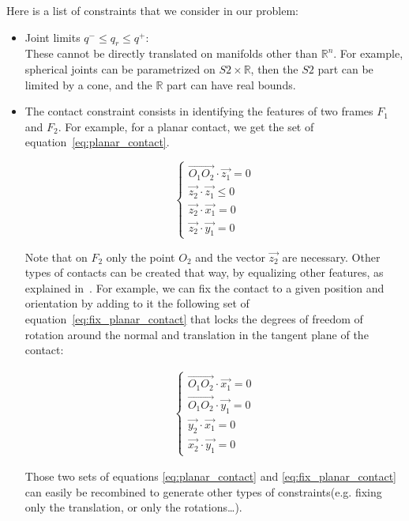 Here is a list of constraints that we consider in our problem:
\begin{itemize}
\item Joint limits ${q^-} \leq q_r \leq {q^+}$:\\
  These cannot be directly translated on manifolds other than $\mathbb{R}^n$.
  For example, spherical joints can be parametrized on $S2 \times \mathbb{R}$, then the $S2$ part can be limited by a cone, and the $\mathbb{R}$ part can have real bounds.
\item The contact constraint consists in identifying the features of two frames $F_1$ and $F_2$.
  For example, for a planar contact, we get the set of equation~\ref{eq:planar_contact}.

  \begin{equation}
  \left\{
  \begin{array}{ll}
    \overrightarrow{O_1O_2}\cdot\vec{z_1} = 0\\
    \vec{z_2}\cdot\vec{z_1} \leq 0 \\
    \vec{z_2}\cdot\vec{x_1} = 0 \\
    \vec{z_2}\cdot\vec{y_1} = 0
  \end{array}
  \right.
  \label{eq:planar_contact}
  \end{equation}

  Note that on $F_2$ only the point $O_2$ and the vector $\vec{z_2}$ are necessary.
  Other types of contacts can be created that way, by equalizing other features, as explained in~\cite{escande:ras:2013}.
  For example, we can fix the contact to a given position and orientation by adding to it the following set of equation~\ref{eq:fix_planar_contact} that locks the degrees of freedom of rotation around the normal and translation in the tangent plane of the contact:

  \begin{align}
  \left\{
  \begin{array}{ll}
    \overrightarrow{O_1O_2} \cdot \vec{x_1} = 0 \\
    \overrightarrow{O_1O_2} \cdot \vec{y_1} = 0 \\
    \vec{y_2} \cdot \vec{x_1} = 0 \\
    \vec{x_2} \cdot \vec{y_1} = 0
  \end{array}
  \right.
  \label{eq:fix_planar_contact}
  \end{align}

  Those two sets of equations \ref{eq:planar_contact} and \ref{eq:fix_planar_contact} can easily be recombined to generate other types of constraints(e.g. fixing only the translation, or only the rotations\ldots).


\end{itemize}
